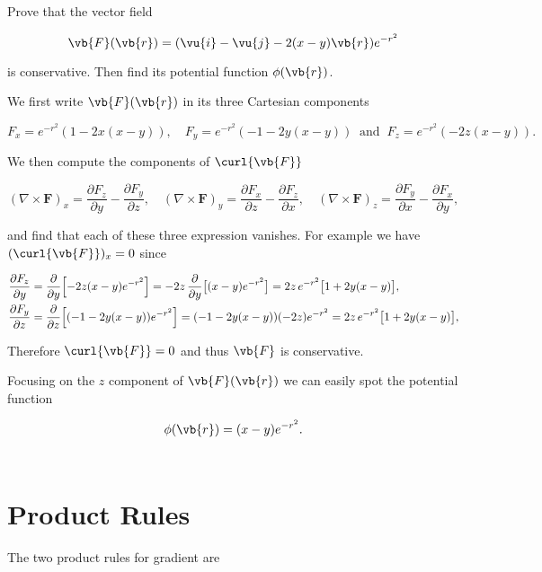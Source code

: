 \documentclass[english,a4paper,12pt]{report}
\begin{document}
{Prove that the vector field 

\begin{equation}
	\vb{F} (\vb{r} ) = (\vu{i} - \vu{j} - 2(x-y)\vb{r}) e^{-r^2} 
\end{equation}

is conservative. Then find its potential function \(\phi (\vb{r} )\). 
}
{We first write \(\vb{F} (\vb{r} )\) in its three Cartesian components

\begin{equation}
	F_{x} = e^{-r^2} (1-2x(x-y)), \quad F_{y} = e^{-r^2}(-1-2y(x-y)) ~\text { and }~ F_{z} = e^{-r^2}(-2z(x-y)).     
\end{equation}

We then compute the components of \(\curl{\vb{F} } \)  

\begin{equation}
	(\nabla\times\mathbf F)_{x}
=\frac{\partial F_{z}}{\partial y}-\frac{\partial F_{y}}{\partial z},
\quad
(\nabla\times\mathbf F)_{y}
=\frac{\partial F_{x}}{\partial z}-\frac{\partial F_{z}}{\partial x},
\quad
(\nabla\times\mathbf F)_{z}
=\frac{\partial F_{y}}{\partial x}-\frac{\partial F_{x}}{\partial y},
\end{equation}

and find that each of these three expression vanishes. For example we have \((\curl{\vb{F} } )_{x} = 0\) since 

\begin{equation}
	\begin{aligned} 
	\frac{\partial F_{z}}{\partial y}
&=\frac{\partial}{\partial y}\Bigl[-2z(x-y)e^{-r^{2}}\Bigr]
=-2z\,\frac{\partial}{\partial y}\bigl[(x-y)e^{-r^{2}}\bigr]
=2z\,e^{-r^{2}}\bigl[1+2y(x-y)\bigr],\\
\frac{\partial F_{y}}{\partial z}
&=\frac{\partial}{\partial z}\Bigl[(-1-2y(x-y))e^{-r^{2}}\Bigr]
=(-1-2y(x-y))(-2z)e^{-r^{2}}
=2z\,e^{-r^{2}}\bigl[1+2y(x-y)\bigr],
\end{aligned} 
\end{equation}

Therefore \(\curl{\vb{F} }  = 0\) and thus \(\vb{F} \) is conservative.  

Focusing on the \(z\) component of \(\vb{F} (\vb{r} )\) we can easily spot the potential function 

\begin{equation}
	\phi (\vb{r} ) = (x-y)e^{-r^2}. 
\end{equation}
~
} 


\section{Product Rules}
The two product rules for gradient are
\end{document}
